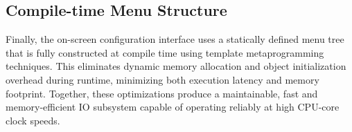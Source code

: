 \subsection{Compile-time Menu Structure} Finally, the on-screen configuration interface uses a statically defined menu tree that is fully constructed at compile time using template metaprogramming techniques. This eliminates dynamic memory allocation and object initialization overhead during runtime, minimizing both execution latency and memory footprint. Together, these optimizations produce a maintainable, fast and memory-efficient IO subsystem capable of operating reliably at high CPU-core clock speeds.
\vfill

\begin{lstfloat}[H]
  
  \caption{The IO system's menu tree is defined as a type and built at compile-time.}
  \label{lst:menu}
\end{lstfloat}
